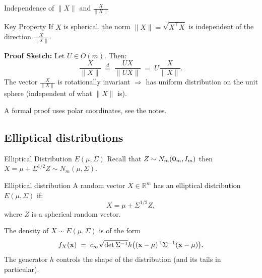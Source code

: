 \documentclass[11pt,handout,aspectratio=169]{beamer}
\begin{document}
\begin{frame}{Independence of $\|X\|$ and $\frac{X}{\|X\|}$}
\begin{alertblock}{Key Property}
	If $X$ is spherical, the norm $\|X\| = \sqrt{X^\top X}$ is independent of the direction $\frac{X}{\|X\|}$.
\end{alertblock}
  \textbf{Proof Sketch:}
Let $U \in O(m)$. Then:
$$
        \frac{X}{\|X\|} \;\overset{d}{=}\; \frac{UX}{\|UX\|} \;=\; U \frac{X}{\|X\|}.
$$
The vector $\frac{X}{\|X\|}$ is rotationally invariant $\Longrightarrow$ has uniform distribution on the unit sphere (independent of what $\|X\|$ is).
\bigskip

A formal proof uses polar coordinates, see the notes.
\end{frame}


\subsection{Elliptical distributions}

\begin{frame}{Elliptical Distribution $E(\mu,\Sigma)$}
Recall that $Z\sim N_m(\boldsymbol 0_m,I_m)$ then $X=\mu+\Sigma^{1/2}Z\sim N_m(\mu,\Sigma)$.
\begin{block}{Elliptical distribution}
A random vector $X \in \mathbb{R}^m$ has an elliptical distribution \alert{$E(\mu,\Sigma)$} if:
  \begin{equation*}
    X = \mu + \Sigma^{1/2} Z,
  \end{equation*}
  where $Z$ is a spherical random vector.	
\end{block}
The density of $X\sim E(\mu,\Sigma)$ is of the form $$f_X(\mathbf{x})\;=\;c_m \sqrt{\det{\Sigma^{-1}}}h\big((\mathbf{x}-\mu)^\top\Sigma^{-1}(\mathbf{x}-\mu)\big).$$
The generator $h$ controls the shape of the distribution (and its tails in particular). 
\end{frame}
\end{document}
